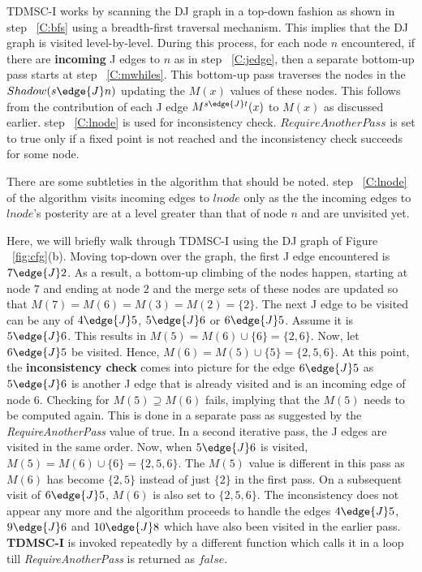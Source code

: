 TDMSC-I works by scanning the DJ graph in a top-down fashion as shown in step ~\ref{C:bfs}
using a breadth-first traversal mechanism. This implies that the DJ graph is visited
level-by-level. During this process, for each node $n$ encountered, if there are {\bf incoming}
J edges to $n$ as in step ~\ref{C:jedge}, then a separate bottom-up pass starts at 
step ~\ref{C:mwhiles}. This bottom-up pass traverses the nodes in the $Shadow(s \edge{J} n)$
updating the $M(x)$ values of these nodes. This follows from the contribution of each
J edge $M^{s \edge{J} t}(x)$ to $M(x)$ as discussed earlier. step ~\ref{C:lnode} is used for
inconsistency check. $RequireAnotherPass$ is set to true only if a fixed point is not reached
and the inconsistency check succeeds for some node.

There are some subtleties in the algorithm that should be noted. step ~\ref{C:lnode} of the algorithm
visits incoming edges to $lnode$ only as the the incoming edges to $lnode$'s posterity are at
a level greater than that of node $n$ and are unvisited yet. 

Here, we will briefly walk through TDMSC-I using the DJ graph of Figure ~\ref{fig:cfg}(b).
Moving top-down over the graph, the first J edge encountered is $7 \edge{J} 2$.
As a result, a bottom-up climbing of the nodes happen, starting at node $7$ and
ending at node $2$ and the merge sets of these nodes are updated so that
$M(7) = M(6) = M(3) = M(2) = \{2\}$. The next J edge
to be visited can be any of $4 \edge{J} 5$, $5 \edge{J} 6$ or $6 \edge{J} 5$. Assume it is $5 \edge{J} 6$. This
results in $M(5) = M(6) \cup \{6\} = \{2,6\}$. Now, let $6 \edge{J} 5$ be
visited. Hence, $M(6) = M(5) \cup \{5\} = \{2,5,6\}$. At this point, 
the {\bf inconsistency check} comes into picture for the edge $6 \edge{J} 5$ as $5 \edge{J} 6$
is another J edge that is already visited and is an incoming edge of node $6$.
Checking for $M(5) \supseteq M(6)$ fails, implying that the $M(5)$ needs to 
be computed again. This is done in a separate pass as suggested by the {\it RequireAnotherPass}
value of true. In a second iterative pass, the J edges are visited in the same
order. Now, when $5 \edge{J} 6$ is visited, $M(5) = M(6) \cup \{6\} = \{2,5,6\}$. The
$M(5)$ value is different in this pass as $M(6)$ has become $\{2,5\}$ instead
of just $\{2\}$ in the first pass. On a subsequent visit of $6 \edge{J} 5$, $M(6)$ is
also set to $\{2,5,6\}$. The inconsistency does not appear any more and the algorithm 
proceeds to handle the edges $4 \edge{J} 5$, $9 \edge{J} 6$ and $10 \edge{J} 8$ which have
also been visited in the earlier pass. {\bf TDMSC-I} is invoked repeatedly by a different function
which calls it in a loop till {\it RequireAnotherPass} is returned as $false$.

